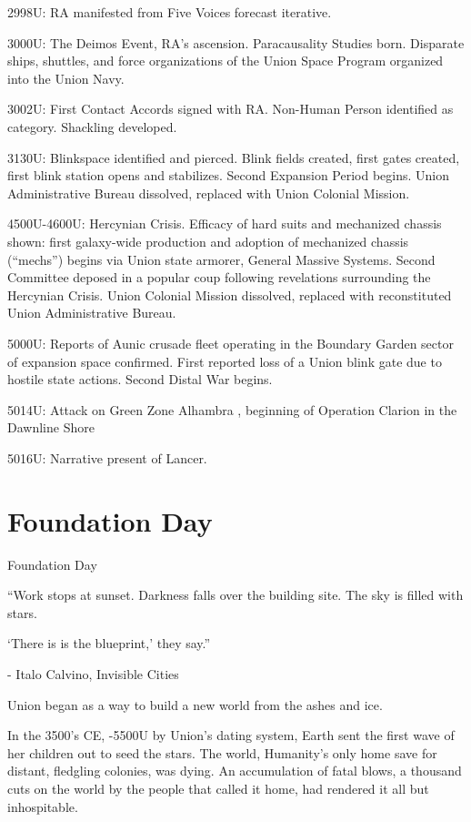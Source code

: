 2998U: RA manifested from Five Voices forecast iterative.


3000U: The Deimos Event, RA’s ascension. Paracausality Studies born. Disparate ships, shuttles,
and force organizations of the Union Space Program organized into the Union Navy.





3002U: First Contact Accords signed with RA. Non-Human Person identified as category.
Shackling developed.


3130U: Blinkspace identified and pierced. Blink fields created, first gates created, first blink
station opens and stabilizes. Second Expansion Period begins. Union Administrative Bureau
dissolved, replaced with Union Colonial Mission.


4500U-4600U: Hercynian Crisis. Efficacy of hard suits and mechanized chassis shown: first
galaxy-wide production and adoption of mechanized chassis (“mechs”) begins via Union state
armorer, General Massive Systems. Second Committee deposed in a popular coup following
revelations surrounding the Hercynian Crisis. Union Colonial Mission dissolved, replaced with
reconstituted Union Administrative Bureau.


5000U: Reports of Aunic crusade fleet operating in the Boundary Garden sector of expansion
space confirmed. First reported loss of a Union blink gate due to hostile state actions. Second
Distal War begins.


5014U: Attack on Green Zone Alhambra , beginning of Operation Clarion in the Dawnline Shore


5016U: Narrative present of Lancer.


\section{Foundation Day}

Foundation Day

         “Work stops at sunset. Darkness falls over the building site. The sky is filled with stars.

         ‘There is is the blueprint,’ they say.”

                      -    Italo Calvino, Invisible Cities

Union began as a way to build a new world from the ashes and ice.


In the 3500’s CE, -5500U by Union’s dating system, Earth sent the first wave of her children out
to seed the stars. The world, Humanity’s only home save for distant, fledgling colonies, was
dying. An accumulation of fatal blows, a thousand cuts on the world by the people that called it
home, had rendered it all but inhospitable.


